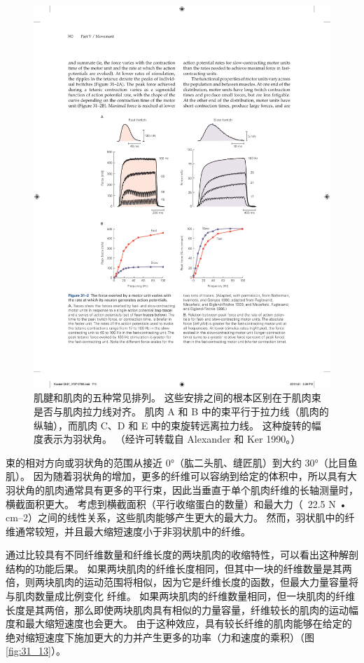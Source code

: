 \begin{figure}[htbp]
	\centering
	\includegraphics[width=0.7\linewidth]{chap31/fig_31_2}
	\caption{肌腱和肌肉的五种常见排列。 这些安排之间的根本区别在于肌肉束是否与肌肉拉力线对齐。 肌肉 A 和 B 中的束平行于拉力线（肌肉的纵轴），而肌肉 C、D 和 E 中的束旋转远离拉力线。 这种旋转的幅度表示为羽状角。 （经许可转载自 Alexander 和 Ker 1990。）}
	\label{fig:31_12}
\end{figure}


束的相对方向或羽状角的范围从接近 0°（肱二头肌、缝匠肌）到大约 30°（比目鱼肌）。
因为随着羽状角的增加，更多的纤维可以容纳到给定的体积中，所以具有大羽状角的肌肉通常具有更多的平行束，因此当垂直于单个肌肉纤维的长轴测量时，横截面积更大。
考虑到横截面积（平行收缩蛋白的数量）和最大力（~22.5 N • cm–2）之间的线性关系，这些肌肉能够产生更大的最大力。
然而，羽状肌中的纤维通常较短，并且最大缩短速度小于非羽状肌中的纤维。


通过比较具有不同纤维数量和纤维长度的两块肌肉的收缩特性，可以看出这种解剖结构的功能后果。
如果两块肌肉的纤维长度相同，但其中一块的纤维数量是其两倍，则两块肌肉的运动范围将相似，因为它是纤维长度的函数，但最大力量容量将与肌肉数量成比例变化 纤维。
如果两块肌肉的纤维数量相同，但一块肌肉的纤维长度是其两倍，那么即使两块肌肉具有相似的力量容量，纤维较长的肌肉的运动幅度和最大缩短速度也会更大。
由于这种效应，具有较长纤维的肌肉能够在给定的绝对缩短速度下施加更大的力并产生更多的功率（力和速度的乘积）（图 \ref{fig:31_13}）。


